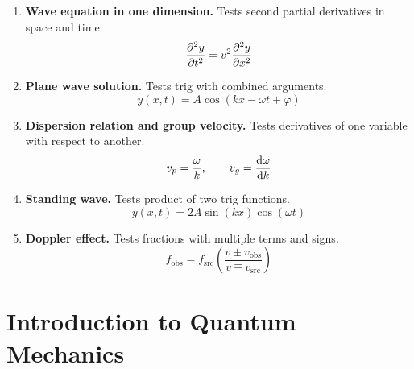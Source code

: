 \documentclass[11pt]{article}
\begin{document}
\begin{enumerate}

\item \textbf{Wave equation in one dimension.}
Tests second partial derivatives in space and time.
\[
  \pdv[2]{y}{t} = v^2 \pdv[2]{y}{x}
\]

\item \textbf{Plane wave solution.}
Tests trig with combined arguments.
\[
  y(x,t) = A\cos(kx - \omega t + \varphi)
\]

\item \textbf{Dispersion relation and group velocity.}
Tests derivatives of one variable with respect to another.
\[
  v_p = \frac{\omega}{k}, \qquad
  v_g = \dv{\omega}{k}
\]

\item \textbf{Standing wave.}
Tests product of two trig functions.
\[
  y(x,t) = 2A \sin(kx) \cos(\omega t)
\]

\item \textbf{Doppler effect.}
Tests fractions with multiple terms and signs.
\[
  f_{\text{obs}} = f_{\text{src}}
  \left(\frac{v \pm v_{\text{obs}}}{v \mp v_{\text{src}}}\right)
\]

\end{enumerate}

\section{Introduction to Quantum Mechanics}
\end{document}
